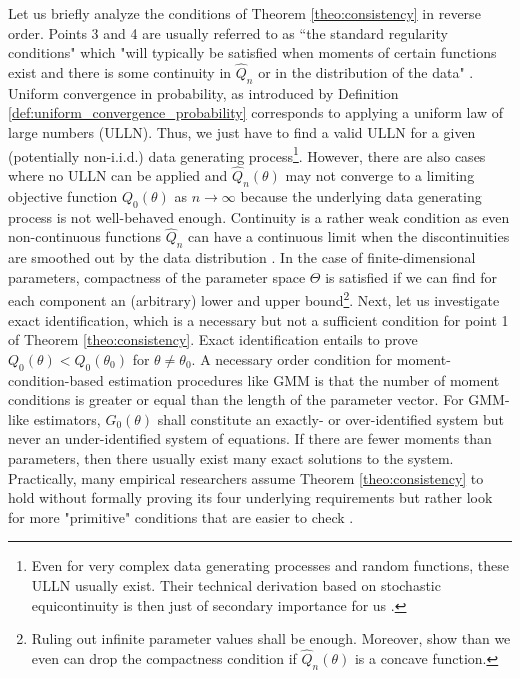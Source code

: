 Let us briefly analyze the conditions of Theorem \ref{theo:consistency} in reverse order.
Points 3 and 4 are usually referred to as ``the standard regularity conditions" which "will typically be satisfied when moments of certain functions exist and there is some continuity in $\hat{Q}_n$ or in the distribution of the data" \cite[p. 2123]{NM94}.
Uniform convergence in probability, as introduced by Definition	\ref{def:uniform_convergence_probability} corresponds to applying a uniform law of large numbers (ULLN).
Thus, we just have to find a valid ULLN for a given (potentially non-i.i.d.) data generating process\footnote{Even for very complex data generating processes and random functions, these ULLN usually exist. Their technical derivation based on stochastic equicontinuity is then just of secondary importance for us \cite[Section 2.7]{NM94}.}.
However, there are also cases where no ULLN can be applied and $\hat{Q}_n(\theta)$ may not converge to a limiting objective function $Q_0(\theta)$ as $n \to \infty$ because the underlying data generating process is not well-behaved enough.
Continuity is a rather weak condition as even non-continuous functions $\hat{Q}_n$ can have a continuous limit when the discontinuities are smoothed out by the data distribution \cite[Section 7]{NM94}.
In the case of finite-dimensional parameters, compactness of the parameter space $\Theta$ is satisfied if we can find for each component an (arbitrary) lower and upper bound\footnote{Ruling out infinite parameter values shall be enough. Moreover, \cite[Section 2.6]{NM94} show than we even can drop the compactness condition if $\hat{Q}_n(\theta)$ is a concave function.}.
Next, let us investigate exact identification, which is a necessary but not a sufficient condition for point 1 of Theorem \ref{theo:consistency}.
Exact identification entails to prove $Q_0(\theta) < Q_0(\theta_0)$ for $\theta \neq \theta_0$.
A necessary order condition for moment-condition-based estimation procedures like GMM is that the number of moment conditions is greater or equal than the length of the parameter vector.
For GMM-like estimators, $G_0(\theta)$ shall constitute an exactly- or over-identified system but never an under-identified system of equations.
If there are fewer moments than parameters, then there usually exist many exact solutions to the system.
Practically, many empirical researchers assume Theorem \ref{theo:consistency} to hold without formally proving its four underlying requirements but rather look for more "primitive" conditions that are easier to check \cite[pp. 2122]{NM94}.

